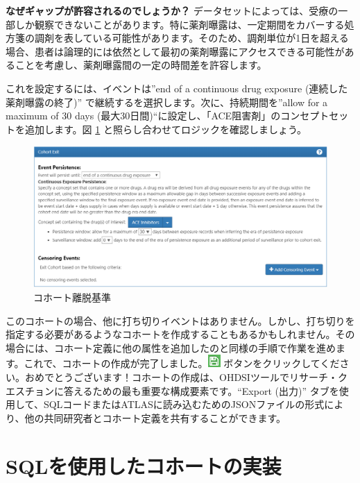 \documentclass[
  11pt]{book}
\theoremstyle{definition}
\theoremstyle{definition}
\theoremstyle{definition}
\theoremstyle{definition}
\theoremstyle{remark}
\begin{document}
\textbf{なぜギャップが許容されるのでしょうか？} データセットによっては、受療の一部しか観察できないことがあります。特に薬剤曝露は、一定期間をカバーする処方箋の調剤を表している可能性があります。そのため、調剤単位が1日を超える場合、患者は論理的には依然として最初の薬剤曝露にアクセスできる可能性があることを考慮し、薬剤曝露間の一定の時間差を許容します。

これを設定するには、イベントは''end of a continuous drug exposure (連続した薬剤曝露の終了)'' で継続するを選択します。次に、持続期間を''allow for a maximum of 30 days (最大30日間)``に設定し、「ACE阻害剤」のコンセプトセットを追加します。図 \ref{fig:ATLAScohortexit} と照らし合わせてロジックを確認しましょう。

\begin{figure}

{\centering \includegraphics[width=1\linewidth]{images/Cohorts/cohort-exit} 

}

\caption{コホート離脱基準}\label{fig:ATLAScohortexit}
\end{figure}

このコホートの場合、他に打ち切りイベントはありません。しかし、打ち切りを指定する必要があるようなコホートを作成することもあるかもしれません。その場合には、コホート定義に他の属性を追加したのと同様の手順で作業を進めます。これで、コホートの作成が完了しました。\includegraphics{images/Cohorts/save.png} ボタンをクリックしてください。おめでとうございます！コホートの作成は、OHDSIツールでリサーチ・クエスチョンに答えるための最も重要な構成要素です。``Export (出力)'' タブを使用して、SQLコードまたはATLASに読み込むためのJSONファイルの形式により、他の共同研究者とコホート定義を共有することができます。

\section{SQLを使用したコホートの実装}\label{sqlux3092ux4f7fux7528ux3057ux305fux30b3ux30dbux30fcux30c8ux306eux5b9fux88c5}
\end{document}
